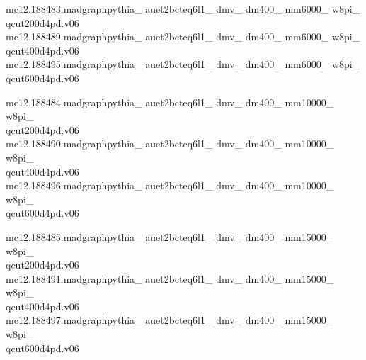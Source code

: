 mc12.188483.madgraphpythia\_ auet2bcteq6l1\_ dmv\_ dm400\_ mm6000\_ w8pi\_ \\ qcut200d4pd.v06\\
mc12.188489.madgraphpythia\_ auet2bcteq6l1\_ dmv\_ dm400\_ mm6000\_ w8pi\_ \\ qcut400d4pd.v06\\
mc12.188495.madgraphpythia\_ auet2bcteq6l1\_ dmv\_ dm400\_ mm6000\_ w8pi\_ \\ qcut600d4pd.v06

mc12.188484.madgraphpythia\_ auet2bcteq6l1\_ dmv\_ dm400\_ mm10000\_ w8pi\_ \\ qcut200d4pd.v06\\
mc12.188490.madgraphpythia\_ auet2bcteq6l1\_ dmv\_ dm400\_ mm10000\_ w8pi\_ \\ qcut400d4pd.v06\\
mc12.188496.madgraphpythia\_ auet2bcteq6l1\_ dmv\_ dm400\_ mm10000\_ w8pi\_ \\ qcut600d4pd.v06

mc12.188485.madgraphpythia\_ auet2bcteq6l1\_ dmv\_ dm400\_ mm15000\_ w8pi\_ \\ qcut200d4pd.v06\\
mc12.188491.madgraphpythia\_ auet2bcteq6l1\_ dmv\_ dm400\_ mm15000\_ w8pi\_ \\ qcut400d4pd.v06\\
mc12.188497.madgraphpythia\_ auet2bcteq6l1\_ dmv\_ dm400\_ mm15000\_ w8pi\_ \\ qcut600d4pd.v06